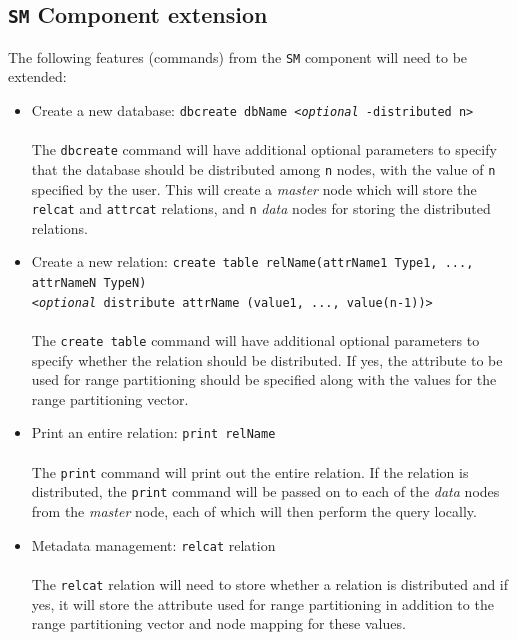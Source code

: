 \documentclass[letterpaper,11pt]{article}
\begin{document}
\subsection{\texttt{SM} Component extension}
The following features (commands) from the \texttt{SM} component will need to be extended:
\begin{itemize}
\item Create a new database: \texttt{dbcreate dbName <{\it optional} -distributed n>}\\
\\The \texttt{dbcreate} command will have additional optional parameters to specify
that the database should be distributed among \texttt{n} nodes, with the value of \texttt{n}
specified by the user. This will create a \textit{master} node which will store the \texttt{relcat}
and \texttt{attrcat} relations, and \texttt{n} \textit{data} nodes for storing the distributed
relations.

\item Create a new relation: \texttt{create table relName(attrName1 Type1, ..., attrNameN TypeN)
\\<{\it optional} distribute attrName (value1, ..., value(n-1))>}\\
\\The \texttt{create table} command will have additional optional parameters to specify whether
the relation should be distributed. If yes, the attribute to be used for range partitioning should
be specified along with the values for the range partitioning vector.

\item Print an entire relation: \texttt{print relName}\\
\\The \texttt{print} command will print out the entire relation. If the relation is distributed,
the \texttt{print} command will be passed on to each of the \textit{data} nodes from the \textit
{master} node, each of which will then perform the query locally.

\item Metadata management: \texttt{relcat} relation\\
\\ The \texttt{relcat} relation will need to store whether a relation is distributed and if yes,
it will store the attribute used for range partitioning in addition to the range partitioning
vector and node mapping for these values.

\end{itemize}
\end{document}
